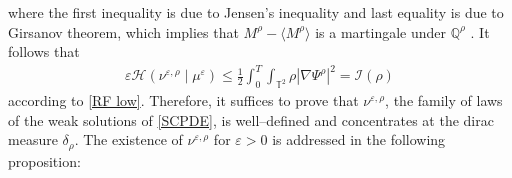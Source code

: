 where the first inequality is due to Jensen's inequality and last equality is due to Girsanov theorem, which implies that $M^{\rho} -\langle M^{\rho}\rangle$ is a martingale under $\mathbb{Q}^{\rho}$ . It follows that 
\begin{align}\label{entropy-check}
\varepsilon\mathcal{H}\left(\nu^{\varepsilon,\rho}\mid
\mu^{\varepsilon}\right)
\leq \frac{1}{2}
\int_0^T\int_{\mathbb{T}^2} \rho \left|\nabla\Psi^{\rho}\right|^2 = \mathcal{I}(\rho)
\end{align}
according to \eqref{RF low}. Therefore, it suffices to prove that $\nu^{\varepsilon, \rho}$, the family of laws of the weak solutions of \eqref{SCPDE}, is well--defined and concentrates at the dirac measure $\delta_{\rho}$. The existence of $\nu^{\varepsilon, \rho}$ for $\varepsilon > 0$ is addressed in the following proposition:


